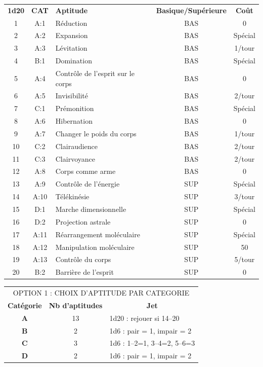 \documentclass[11pt]{article}
\begin{document}
{\begin{tabular}{cclcc}
\textbf{1d20}    & \textbf{CAT}   & \textbf{Aptitude} & \textbf{Basique/Supérieure} & \textbf{Coût}  \\
1       & A:1   & Réduction                 & BAS & 0  \\
2       & A:2   & Expansion                 & BAS & Spécial    \\
3       & A:3   & Lévitation                & BAS & 1/tour    \\
4       & B:1   & Domination                & BAS & Spécial   \\
5       & A:4   & Contrôle de l'esprit sur le corps & BAS & 0  \\
6       & A:5   & Invisibilité              & BAS & 2/tour  \\
7       & C:1   & Prémonition               & BAS & Spécial  \\
8       & A:6   & Hibernation               & BAS & 0  \\
9       & A:7   & Changer le poids du corps & BAS & 1/tour \\
10      & C:2   & Clairaudience             & BAS & 2/tour \\
11      & C:3   & Clairvoyance              & BAS & 2/tour \\
12      & A:8   & Corps comme arme          & BAS & 0 \\
13      & A:9   & Contrôle de l'énergie     & SUP & Spécial \\
14      & A:10  & Télékinésie               & SUP & 3/tour\\
15      & D:1   & Marche dimensionnelle     & SUP & Spécial\\
16      & D:2   & Projection astrale        & SUP & 0\\
17      & A:11  & Réarrangement moléculaire & SUP & Spécial\\
18      & A:12  & Manipulation moléculaire  & SUP & 50\\
19      & A:13  & Contrôle du corps         & SUP & 5/tour\\
20      & B:2   & Barrière de l'esprit      & SUP & 0\\
\end{tabular}

\bigskip

\begin{tabular}{ccl}
\multicolumn{3}{c}{OPTION 1 : CHOIX D'APTITUDE PAR CATEGORIE} \\
\textbf{Catégorie} &  \textbf{Nb d'aptitudes} & \multicolumn{1}{c}{\textbf{Jet}} \\
\textbf{A} & 13 & 1d20 : rejouer si 14--20 \\
\textbf{B} & 2 & 1d6 : pair = 1, impair = 2 \\
\textbf{C} & 3 & 1d6 : 1--2=1, 3--4=2, 5--6=3 \\
\textbf{D} & 2 & 1d6 : pair = 1, impair = 2 \\
\end{tabular}




}
\end{document}
